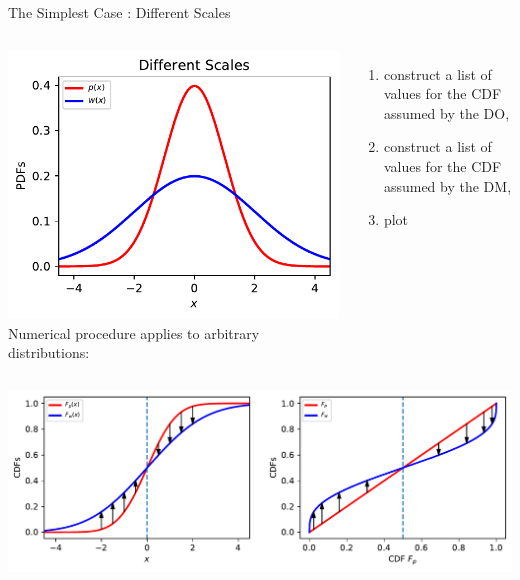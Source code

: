 \begin{frame}{The Simplest Case : Different Scales}
\centering
\begin{columns}[T]
\centering
	\includegraphics[width=1.1\textwidth]{../../figs/2GaussianPDFs2Scales.pdf}
Numerical procedure applies to arbitrary distributions:
\begin{enumerate}
	\item construct a list of values for the CDF assumed by the DO, 
	\item construct a list of values for the CDF assumed by the DM, 
	\item plot  \vs {}
\end{enumerate}
\end{columns}
\vspace{1em}
\pause
	\includegraphics[width=.9\textwidth]{../../figs/mapping_cdfs.pdf}
\end{frame}

